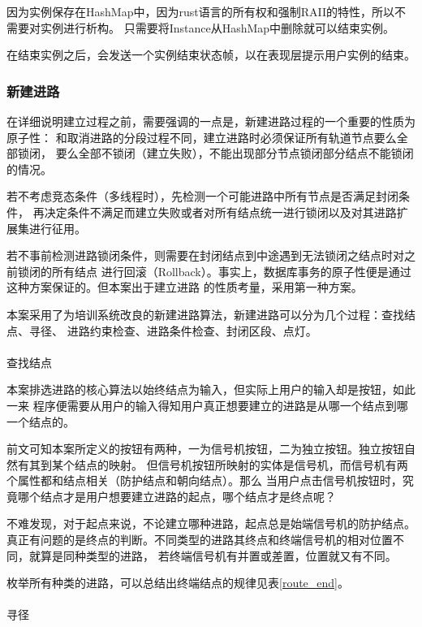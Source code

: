 因为实例保存在HashMap中，因为rust语言的所有权和强制RAII的特性，所以不需要对实例进行析构。
只需要将Instance从HashMap中删除就可以结束实例。

在结束实例之后，会发送一个实例结束状态帧，以在表现层提示用户实例的结束。

\subsubsection{新建进路}
在详细说明建立过程之前，需要强调的一点是，新建进路过程的一个重要的性质为原子性：
和取消进路的分段过程不同，建立进路时必须保证所有轨道节点要么全部锁闭，
要么全部不锁闭（建立失败），不能出现部分节点锁闭部分结点不能锁闭的情况。

若不考虑竞态条件（多线程时），先检测一个可能进路中所有节点是否满足封闭条件，
再决定条件不满足而建立失败或者对所有结点统一进行锁闭以及对其进路扩展集进行征用。

若不事前检测进路锁闭条件，则需要在封闭结点到中途遇到无法锁闭之结点时对之前锁闭的所有结点
进行回滚（Rollback）。事实上，数据库事务的原子性便是通过这种方案保证的。但本案出于建立进路
的性质考量，采用第一种方案。

本案采用了为培训系统改良的新建进路算法，新建进路可以分为几个过程：查找结点、寻径、
进路约束检查、进路条件检查、封闭区段、点灯。

\paragraph{}查找结点

本案排选进路的核心算法以始终结点为输入，但实际上用户的输入却是按钮，如此一来
程序便需要从用户的输入得知用户真正想要建立的进路是从哪一个结点到哪一个结点的。

前文可知本案所定义的按钮有两种，一为信号机按钮，二为独立按钮。独立按钮自然有其到某个结点的映射。
但信号机按钮所映射的实体是信号机，而信号机有两个属性都和结点相关（防护结点和朝向结点）。那么
当用户点击信号机按钮时，究竟哪个结点才是用户想要建立进路的起点，哪个结点才是终点呢？

不难发现，对于起点来说，不论建立哪种进路，起点总是始端信号机的防护结点。
真正有问题的是终点的判断。不同类型的进路其终点和终端信号机的相对位置不同，就算是同种类型的进路，
若终端信号机有并置或差置，位置就又有不同。

枚举所有种类的进路，可以总结出终端结点的规律见表\ref{route_end}。

\paragraph{}寻径

